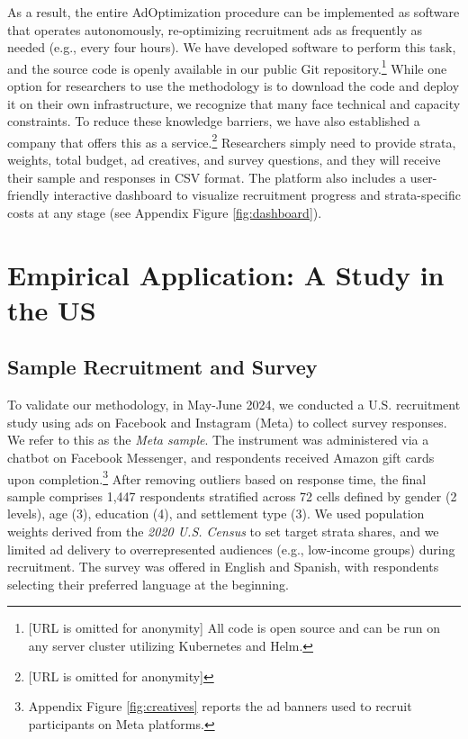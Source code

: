 As a result, the entire AdOptimization procedure can be implemented as software that operates autonomously, re-optimizing recruitment ads as frequently as needed (e.g., every four hours). We have developed software to perform this task, and the source code is openly available in our public Git repository.\footnote{[URL is omitted for anonymity] All code is open source and can be run on any server cluster utilizing Kubernetes and Helm.} While one option for researchers to use the methodology is to download the code and deploy it on their own infrastructure, we recognize that many face technical and capacity constraints. To reduce these knowledge barriers,  we have also established a company that offers this as a service.\footnote{[URL is omitted for anonymity]} Researchers simply need to provide strata, weights, total budget, ad creatives, and survey questions, and they will receive their sample and responses in CSV format. The platform also includes a user-friendly interactive dashboard to visualize recruitment progress and strata-specific costs at any stage (see Appendix Figure \ref{fig:dashboard}).





\section{Empirical Application: A Study in the US}

\subsection{Sample Recruitment and Survey}

To validate our methodology, in May-June 2024, we conducted a U.S. recruitment study using ads on Facebook and Instagram (Meta) to collect survey responses. We refer to this as the \textit{Meta sample}. The instrument was administered via a chatbot on Facebook Messenger, and respondents received Amazon gift cards upon completion.\footnote{Appendix Figure \ref{fig:creatives} reports the ad banners used to recruit participants on Meta platforms.} After removing outliers based on response time, the final sample comprises 1{,}447 respondents stratified across 72 cells defined by gender (2 levels), age (3), education (4), and settlement type (3). We used population weights derived from the \textit{2020 U.S. Census} to set target strata shares, and we limited ad delivery to overrepresented audiences (e.g., low-income groups) during recruitment. The survey was offered in English and Spanish, with respondents selecting their preferred language at the beginning. 

